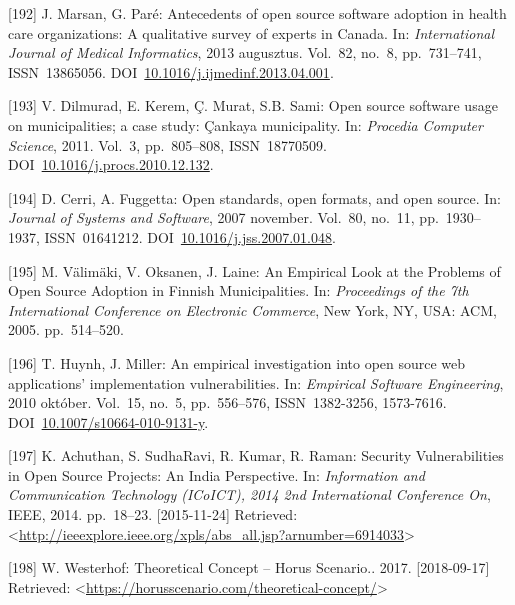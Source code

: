 \documentclass[12pt,magyar,a4paper,oneside]{scrreprt}
\newenvironment{cslreferences}%
  {}%
  {\par}
\begin{document}
\begin{cslreferences}
\leavevmode\hypertarget{ref-marsan_antecedents_2013}{}%
{[}192{]} J. Marsan, G. Paré: Antecedents of open source software
adoption in health care organizations: A qualitative survey of experts
in Canada. In: \emph{International Journal of Medical Informatics}, 2013
augusztus. Vol.~82, no.~8, pp.~731--741, ISSN~13865056.
DOI~\href{https://doi.org/10.1016/j.ijmedinf.2013.04.001}{10.1016/j.ijmedinf.2013.04.001}.

\leavevmode\hypertarget{ref-dilmurad_open_2011}{}%
{[}193{]} V. Dilmurad, E. Kerem, Ç. Murat, S.B. Sami: Open source
software usage on municipalities; a case study: Çankaya municipality.
In: \emph{Procedia Computer Science}, 2011. Vol.~3, pp.~805--808,
ISSN~18770509.
DOI~\href{https://doi.org/10.1016/j.procs.2010.12.132}{10.1016/j.procs.2010.12.132}.

\leavevmode\hypertarget{ref-cerri_open_2007}{}%
{[}194{]} D. Cerri, A. Fuggetta: Open standards, open formats, and open
source. In: \emph{Journal of Systems and Software}, 2007 november.
Vol.~80, no.~11, pp.~1930--1937, ISSN~01641212.
DOI~\href{https://doi.org/10.1016/j.jss.2007.01.048}{10.1016/j.jss.2007.01.048}.

\leavevmode\hypertarget{ref-valimaki_empirical_2005}{}%
{[}195{]} M. Välimäki, V. Oksanen, J. Laine: An Empirical Look at the
Problems of Open Source Adoption in Finnish Municipalities. In:
\emph{Proceedings of the 7th International Conference on Electronic
Commerce}, New York, NY, USA: ACM, 2005. pp.~514--520.

\leavevmode\hypertarget{ref-huynh_empirical_2010}{}%
{[}196{]} T. Huynh, J. Miller: An empirical investigation into open
source web applications' implementation vulnerabilities. In:
\emph{Empirical Software Engineering}, 2010 október. Vol.~15, no.~5,
pp.~556--576, ISSN~1382-3256, 1573-7616.
DOI~\href{https://doi.org/10.1007/s10664-010-9131-y}{10.1007/s10664-010-9131-y}.

\leavevmode\hypertarget{ref-achuthan_security_2014}{}%
{[}197{]} K. Achuthan, S. SudhaRavi, R. Kumar, R. Raman: Security
Vulnerabilities in Open Source Projects: An India Perspective. In:
\emph{Information and Communication Technology (ICoICT), 2014 2nd
International Conference On}, IEEE, 2014. pp.~18--23. {[}2015-11-24{]}
Retrieved:
\textless{}\url{http://ieeexplore.ieee.org/xpls/abs_all.jsp?arnumber=6914033}\textgreater{}

\leavevmode\hypertarget{ref-westerhof_theoretical_2017}{}%
{[}198{]} W. Westerhof: Theoretical Concept -- Horus Scenario.. 2017.
{[}2018-09-17{]} Retrieved:
\textless{}\url{https://horusscenario.com/theoretical-concept/}\textgreater{}


\end{cslreferences}
\end{document}
